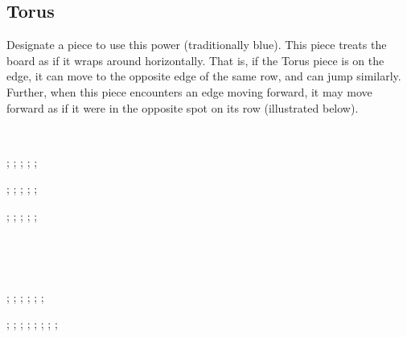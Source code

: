 \documentclass[rulebook.tex]{subfile}
\begin{document}
\subsection*{Torus}
Designate a piece to use this power (traditionally blue).
This piece treats the board as if it wraps around horizontally.
That is, if the Torus piece is on the edge, it can move to the opposite edge of the same row, and can jump similarly.
Further, when this piece encounters an edge moving forward, it may move forward as if it were in the opposite spot on its row (illustrated below).

\

\begin{center}
\begin{struggleboard}
  ;
  ;
  ;
  ;
  ;
\end{struggleboard}
\begin{struggleboard}
  ;
  ;
  ;
  ;
  ;
\end{struggleboard}
\begin{struggleboard}
  ;
  ;
  ;
  ;
  ;
\end{struggleboard}

\

\

\begin{struggleboard}{0.5}
  ;
  ;
  ;
  ;
  ;
  ;
\end{struggleboard}
\quad
\begin{struggleboard}
  ;
  ;
  ;
  ;
  ;
  ;
  ;
  ;
\end{struggleboard}
\end{center}
\end{document}
